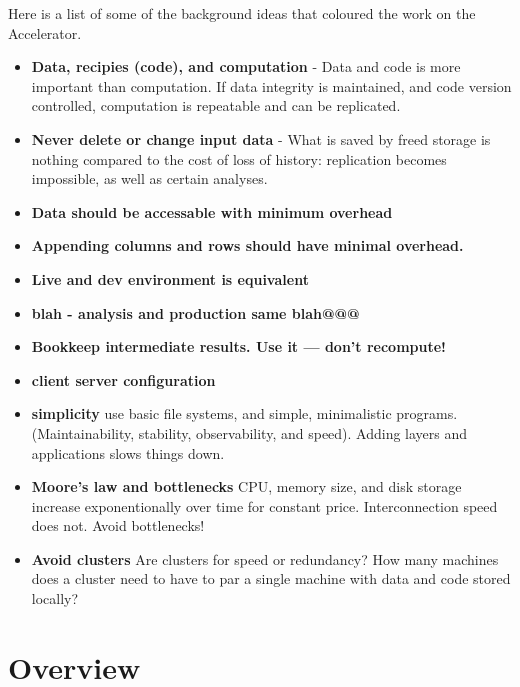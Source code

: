 \documentclass[a4paper]{report}
\begin{document}
\newpage
Here is a list of some of the background ideas that coloured the work
on the Accelerator.
\begin{itemize}

\item \textbf{Data, recipies (code), and computation} - Data and code
  is more important than computation.  If data integrity is
  maintained, and code version controlled, computation is repeatable
  and can be replicated.

\item \textbf{Never delete or change input data} - What is saved by
  freed storage is nothing compared to the cost of loss of history:
  replication becomes impossible, as well as certain analyses.

\item \textbf{Data should be accessable with minimum overhead}

\item \textbf{Appending columns and rows should have minimal overhead.}

\item \textbf{Live and dev environment is equivalent}
\item \textbf{ blah - analysis and production same blah@@@}
  
\item \textbf{Bookkeep intermediate results.  Use it --- don't recompute!}

\item \textbf{client server configuration}

\item \textbf{simplicity} use basic file systems, and simple,
  minimalistic programs.  (Maintainability, stability, observability,
  and speed).  Adding layers and applications slows things down.

\item \textbf{Moore's law and bottlenecks} CPU, memory size, and disk
  storage increase exponentionally over time for constant price.
  Interconnection speed does not.  Avoid bottlenecks!

\item \textbf{Avoid clusters} Are clusters for speed or redundancy?
  How many machines does a cluster need to have to par a single
  machine with data and code stored locally?
\end{itemize}




\chapter{Overview}

\end{document}
